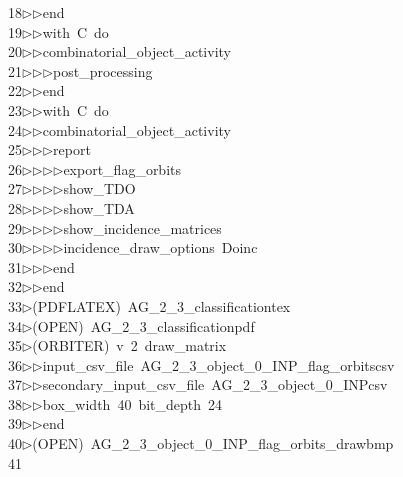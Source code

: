 \begin{tabbing}
18\>$\triangleright$\>$\triangleright$\>end\ \\[0pt]
19\>$\triangleright$\>$\triangleright$\>with\ C\ do\ \\[0pt]
20\>$\triangleright$\>$\triangleright$\>combinatorial\_object\_activity\ \\[0pt]
21\>$\triangleright$\>$\triangleright$\>$\triangleright$\>post\_processing\ \\[0pt]
22\>$\triangleright$\>$\triangleright$\>end\ \\[0pt]
23\>$\triangleright$\>$\triangleright$\>with\ C\ do\ \\[0pt]
24\>$\triangleright$\>$\triangleright$\>combinatorial\_object\_activity\ \\[0pt]
25\>$\triangleright$\>$\triangleright$\>$\triangleright$\>report\ \\[0pt]
26\>$\triangleright$\>$\triangleright$\>$\triangleright$\>$\triangleright$\>export\_flag\_orbits\ \\[0pt]
27\>$\triangleright$\>$\triangleright$\>$\triangleright$\>$\triangleright$\>show\_TDO\ \\[0pt]
28\>$\triangleright$\>$\triangleright$\>$\triangleright$\>$\triangleright$\>show\_TDA\ \\[0pt]
29\>$\triangleright$\>$\triangleright$\>$\triangleright$\>$\triangleright$\>show\_incidence\_matrices\ \\[0pt]
30\>$\triangleright$\>$\triangleright$\>$\triangleright$\>$\triangleright$\>incidence\_draw\_options\ Doinc\ \\[0pt]
31\>$\triangleright$\>$\triangleright$\>$\triangleright$\>end\ \\[0pt]
32\>$\triangleright$\>$\triangleright$\>end\\[0pt]
33\>$\triangleright$\>(PDFLATEX)\ AG\_2\_3\_classificationtex\\[0pt]
34\>$\triangleright$\>(OPEN)\ AG\_2\_3\_classificationpdf\\[0pt]
35\>$\triangleright$\>(ORBITER)\ v\ 2\ draw\_matrix\ \\[0pt]
36\>$\triangleright$\>$\triangleright$\>input\_csv\_file\ AG\_2\_3\_object\_0\_INP\_flag\_orbitscsv\ \\[0pt]
37\>$\triangleright$\>$\triangleright$\>secondary\_input\_csv\_file\ AG\_2\_3\_object\_0\_INPcsv\ \\[0pt]
38\>$\triangleright$\>$\triangleright$\>box\_width\ 40\ bit\_depth\ 24\ \\[0pt]
39\>$\triangleright$\>$\triangleright$\>end\\[0pt]
40\>$\triangleright$\>(OPEN)\ AG\_2\_3\_object\_0\_INP\_flag\_orbits\_drawbmp\\[0pt]
41\>\end{tabbing}
